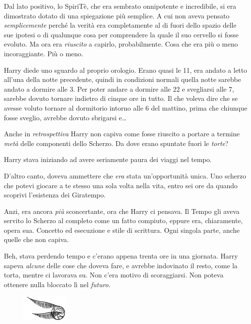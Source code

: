 Dal lato positivo, lo SpiriTè, che era sembrato onnipotente e incredibile, si era dimostrato dotato di una spiegazione più semplice. A cui non aveva pensato \textit{semplicemente} perché la verità era completamente al di fuori dello spazio delle sue ipotesi o di qualunque cosa per comprendere la quale il suo cervello si fosse evoluto. Ma ora era \textit{riuscito} a capirlo, probabilmente. Cosa che era più o meno incoraggiante. Più o meno.

Harry diede uno sguardo al proprio orologio. Erano quasi le 11, era andato a letto all’una della notte precedente, quindi in condizioni normali quella notte sarebbe andato a dormire alle 3. Per poter andare a dormire alle 22 e svegliarsi alle 7, sarebbe dovuto tornare indietro di cinque ore in tutto. Il che voleva dire che se avesse voluto tornare al dormitorio intorno alle 6 del mattino, prima che chiunque fosse sveglio, avrebbe dovuto sbrigarsi e…

Anche in \textit{retrospettiva} Harry non capiva come fosse riuscito a portare a termine \textit{metà} delle componenti dello Scherzo. Da dove erano spuntate fuori le \textit{torte}?

Harry stava iniziando ad avere seriamente paura dei viaggi nel tempo.

D’altro canto, doveva ammettere che \textit{era} stata un’opportunità unica. Uno scherzo che potevi giocare a te stesso una sola volta nella vita, entro sei ore da quando scoprivi l’esistenza dei Giratempo.

Anzi, era ancora \textit{più} sconcertante, ora che Harry ci pensava. Il Tempo gli aveva servito lo Scherzo al completo come un fatto compiuto, eppure era, chiaramente, opera sua. Concetto ed esecuzione e stile di scrittura. Ogni singola parte, anche quelle che non capiva.

Beh, stava perdendo tempo e c’erano appena trenta ore in una giornata. Harry sapeva \textit{alcune} delle cose che doveva fare, e avrebbe indovinato il resto, come la torta, mentre ci lavorava su. Non c’era motivo di scoraggiarsi. Non poteva ottenere nulla bloccato lì nel \textit{futuro.}

\begin{figure}[h!]
        \includegraphics[scale=0.4]{boccino.png}
        \centering
\end{figure}

